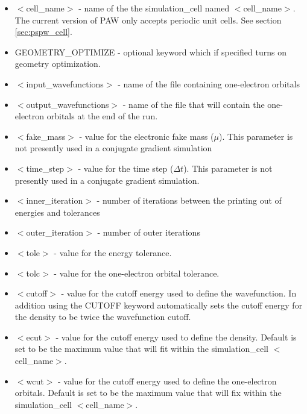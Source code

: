 \begin{itemize}
        \item $<$cell\_name$>$ - name of the
              the simulation\_cell named $<$cell\_name$>$. The
              current version of PAW only accepts periodic unit cells.  
              See section \ref{sec:pspw_cell}.
        \item GEOMETRY\_OPTIMIZE - optional keyword which if specified
              turns on geometry optimization.   
        \item $<$input\_wavefunctions$>$ - name of the
              file containing one-electron orbitals
        \item $<$output\_wavefunctions$>$ - name of the
              file that will contain the one-electron orbitals at the
              end of the run. 
        \item $<$fake\_mass$>$ - value for the electronic
              fake mass ($\mu$). This parameter is not presently used in a 
              conjugate gradient simulation
        \item $<$time\_step$>$ - value for the time step ($\Delta t$).  This
              parameter is not presently used in a conjugate gradient simulation.
        \item $<$inner\_iteration$>$ - number of iterations between the 
              printing out of energies and tolerances
        \item $<$outer\_iteration$>$ - number of outer iterations
        \item $<$tole$>$ - value for the energy tolerance.
        \item $<$tolc$>$ - value for the one-electron orbital tolerance.
        \item $<$cutoff$>$ - value for the cutoff energy used to define the wavefunction.  In addition
                             using the CUTOFF keyword automatically sets the cutoff energy for the density
                             to be twice the wavefunction cutoff.
        \item $<$ecut$>$ - value for the cutoff energy used
                           to define the density. Default is set
                           to be the maximum value that will fit
                            within the simulation\_cell $<$cell\_name$>$.
        \item $<$wcut$>$ - value for the cutoff energy used
                           to define the one-electron orbitals.
                           Default is set to be the maximum value that 
                           will fix within the simulation\_cell $<$cell\_name$>$.

\end{itemize}
